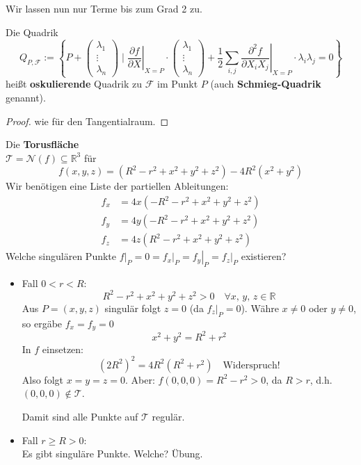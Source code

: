 \documentclass[parskip,a4paper,twoside,DIV15,BCOR12mm]{scrbook}
\begin{document}
Wir lassen nun nur Terme bis zum Grad 2 zu.
\begin{definition}
Die Quadrik
\[
Q_{P,\mathcal{F}}:=\left\{
    P+\begin{pmatrix}\lambda_{1}\\\vdots\\\lambda_{n}\end{pmatrix}\mid
    \left.\frac{\partial f}{\partial X}\right|_{X=P}\cdot
	\begin{pmatrix}\lambda_{1}\\\vdots\\\lambda_{n}\end{pmatrix}
    +\frac{1}{2}\sum_{i,j}{
	\left.\frac{\partial^{2}f}{\partial X_{i}X_{j}}\right|_{X=P}
	\cdot\lambda_{i}\lambda_{j}}=0\right\}
\]
heißt \textbf{oskulierende} Quadrik zu \(\mathcal{F}\) im Punkt \(P\) (auch
\textbf{Schmieg-Quadrik} genannt).
\end{definition}
\begin{comment}
\index{Quadrik!oskulierend}\index{Tangentialraum}\index{Affinität}
\index{Invariante!affine}
Die oskulierende Quadrik ist eine affine Invariante wie der Tangentialraum, d.h.
für jede Affinität \(\vp\) gilt:
\[
Q_{\vp(P),\vp(\mathcal{F})}=\vp\left(Q_{P,\mathcal{F}}\right)
\]
\end{comment}
\begin{proof}
wie für den Tangentialraum.
\end{proof}
\begin{example}
Die \textbf{Torusfläche}\\
\(\mathcal{T}=\mathcal{N}(f)\subseteq\mathbb{R}^{3}\) für
\[
f(x,y,z)=(R^{2}-r^{2}+x^{2}+y^{2}+z^{2})-4R^{2}(x^{2}+y^{2})
\]
Wir benötigen eine Liste der partiellen Ableitungen:
\begin{align*}
f_{x}&=4x(-R^{2}-r^{2}+x^{2}+y^{2}+z^{2})\\
f_{y}&=4y(-R^{2}-r^{2}+x^{2}+y^{2}+z^{2})\\
f_{z}&=4z(R^{2}-r^{2}+x^{2}+y^{2}+z^{2})
\end{align*}
Welche singulären Punkte
\(\left.f\right|_{P}=0=
    \left.f_{x}\right|_{P}=\left.f_{y}\right|_{P}=\left.f_{z}\right|_{P}\)
existieren?
\begin{itemize}
\item{Fall \(0<r<R\):}
\[
R^{2}-r^{2}+x^{2}+y^{2}+z^{2}>0\quad\forall x,\,y,\,z\in\mathbb{R}
\]
Aus \(P=(x,y,z)\) singulär folgt \(z=0\) (da \(\left.f_{z}\right|_{P}=0\)).
Währe \(x\neq0\) oder \(y\neq0\), so ergäbe \(f_{x}=f_{y}=0\)
\[
x^{2}+y^{2}=R^{2}+r^{2}
\]
In \(f\) einsetzen:
\[
\left(2R^{2}\right)^{2}=4R^{2}(R^{2}+r^{2})\quad\text{Widerspruch!}
\]
Also folgt \(x=y=z=0\). Aber: \(f(0,0,0)=R^{2}-r^{2}>0\), da \(R>r\), d.h.
\((0,0,0)\not\in\mathcal{T}\).

Damit sind alle Punkte auf \(\mathcal{T}\) regulär.
\item{Fall \(r\geq R>0\):}\\
Es gibt singuläre Punkte. Welche? Übung. %
\end{itemize}
\end{example}
\end{document}
